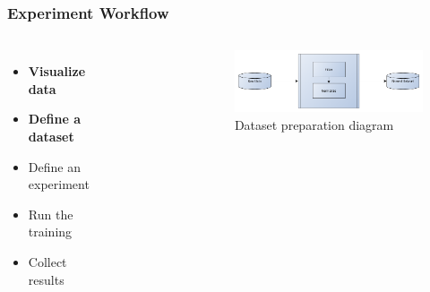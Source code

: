 \documentclass[aspectratio=169,11pt,hyperref={colorlinks=true}]{beamer}
\begin{document}
\begin{frame}
    \frametitle{Experiment Workflow}
    \begin{columns}
        \begin{itemize}
            \item{\textbf{Visualize data}}
            \item{\textbf{Define a dataset}}
            \item{Define an experiment}
            \item{Run the training}
            \item{Collect results}
        \end{itemize}
          \begin{figure}
            
          \end{figure}
          \begin{figure}
            \includegraphics[width=1\textwidth]{diagrams/build-dataset.png}
            \caption{Dataset preparation diagram}
          \end{figure}
    \end{columns}
\end{frame}
\end{document}
